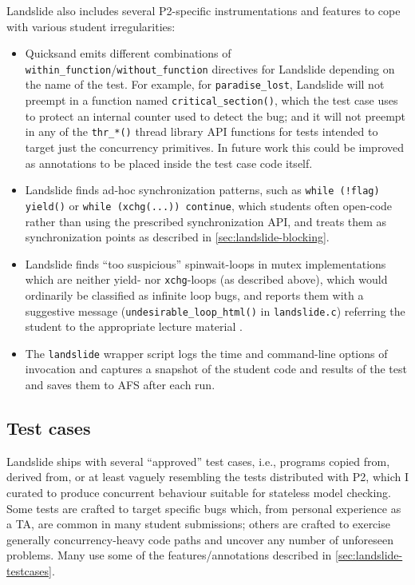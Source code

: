 \noindent Landslide also includes several P2-specific instrumentations and features to cope with various student irregularities:
\begin{itemize}
	\item Quicksand emits different combinations of {\tt within\_function}/{\tt without\_function} directives
		for Landslide depending on the name of the test.
		For example, for {\tt paradise\_\allowbreak{}lost},
		Landslide will not preempt in a function named {\tt critical\_section()},
		which the test case uses to protect an internal counter used to detect the bug;
		and it will not preempt in any of the {\tt thr\_*()} thread library API functions
		for tests intended to target just the concurrency primitives.
		In future work this could be improved as annotations to be placed inside the test case code itself.
	\item Landslide finds ad-hoc synchronization patterns,
		such as {\tt while (!flag) yield()} or {\tt while (xchg(...)) continue},
		which students often open-code rather than using the prescribed synchronization API,
		and treats them as synchronization points as described in \cref{sec:landslide-blocking}.
	\item Landslide finds ``too suspicious'' spinwait-loops in mutex implementations
		which are neither yield- nor {\tt xchg}-loops (as described above),
		which would ordinarily be classified as infinite loop bugs,
		and reports them with a suggestive message ({\tt undesirable\_\allowbreak{}loop\_html()} in {\tt landslide.c})
		referring the student to the appropriate lecture material
		\cite{synchronization-2}.
	\item The {\tt landslide} wrapper script logs the time and command-line options of invocation
		and captures a snapshot of the student code and results of the test and saves them to AFS
		after each run.
\end{itemize}

\subsection{Test cases}
\label{sec:education-pebbles-tests}

Landslide ships with several ``approved'' test cases,
i.e., programs copied from, derived from, or at least vaguely resembling
the tests distributed with P2,
which I curated to produce concurrent behaviour suitable for stateless model checking.
Some tests are crafted to target specific bugs which,
from personal experience as a TA, are common in many student submissions;
others are crafted to exercise generally concurrency-heavy code paths and uncover any number of unforeseen problems.
Many use some of the features/annotations described in \cref{sec:landslide-testcases}.

